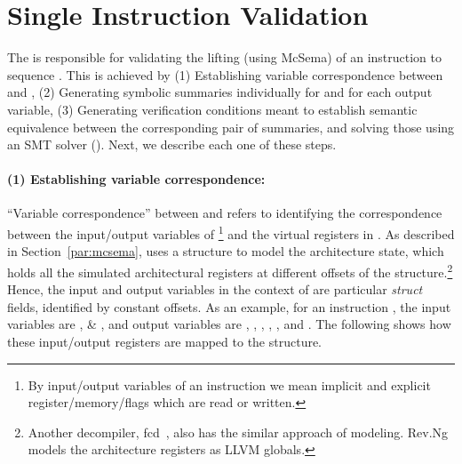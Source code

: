 \section{Single Instruction Validation}\label{sec:siv}

The \siv is responsible for validating the lifting (using McSema) of an \ISA 
instruction  to \LLVM sequence . This is achieved by (1) 
Establishing variable correspondence between  and , (2) Generating 
symbolic summaries 
individually for  and  for each output variable, (3) Generating 
verification conditions meant to establish semantic equivalence between the 
corresponding pair of summaries, and solving those using an SMT solver (\Z). 
Next, we describe each one of these steps.

\paragraph{(1) Establishing variable correspondence:}   
``Variable correspondence'' between  and  refers to identifying the 
correspondence between the input/output variables of \footnote{By 
input/output variables of an instruction we mean implicit and explicit 
    register/memory/flags which are read or written.} and the 
    virtual registers in 
. As described in Section~\ref{par:mcsema}, \mcsema uses a \Mcstate 
structure to
model the architecture state, which holds all the simulated architectural
registers at different offsets of the structure.\footnote{Another decompiler,
  fcd~\cite{FCD}, also has the similar approach of modeling.
    Rev.Ng~\cite{DiFederico:CC2017} models the architecture registers as LLVM
    globals.}  Hence, the input and output variables in the context of
    \mcsema are particular \emph{struct} fields, identified by constant offsets.
%
 As an example, for an instruction , the input variables are
 ,  \& , and output variables are , ,
 , , ,  and . 
The following shows how
 these input/output registers are mapped to the \mcsema \Mcstate structure.

